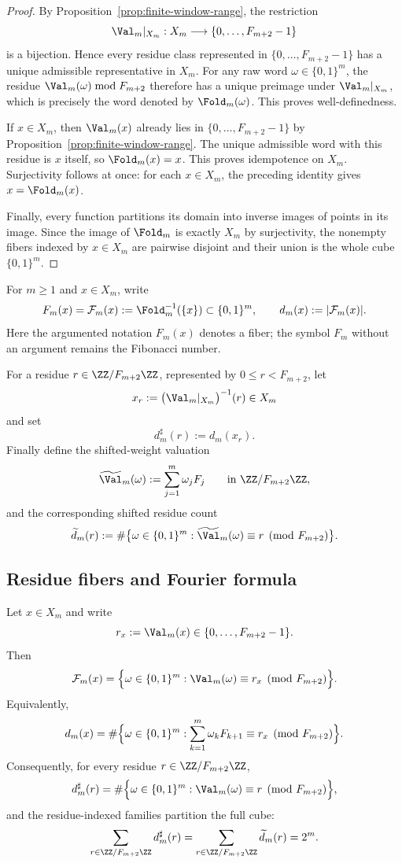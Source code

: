 \begin{proof}
By Proposition~\ref{prop:finite-window-range}, the restriction
\[
\Val_m|_{X_m}:X_m\longrightarrow \{0,\ldots,F_{m+2}-1\}
\]
is a bijection.  Hence every residue class represented in
$\{0,\ldots,F_{m+2}-1\}$ has a unique admissible representative in $X_m$.
For any raw word $\omega\in\{0,1\}^m$, the residue
$\Val_m(\omega)\bmod F_{m+2}$ therefore has a unique preimage under
$\Val_m|_{X_m}$, which is precisely the word denoted by $\Fold_m(\omega)$.
This proves well-definedness.

If $x\in X_m$, then $\Val_m(x)$ already lies in
$\{0,\ldots,F_{m+2}-1\}$ by Proposition~\ref{prop:finite-window-range}.
The unique admissible word with this residue is $x$ itself, so
$\Fold_m(x)=x$.  This proves idempotence on $X_m$.  Surjectivity follows at
once: for each $x\in X_m$, the preceding identity gives $x=\Fold_m(x)$.

Finally, every function partitions its domain into inverse images of points in
its image.  Since the image of $\Fold_m$ is exactly $X_m$ by surjectivity, the
nonempty fibers indexed by $x\in X_m$ are pairwise disjoint and their union is
the whole cube $\{0,1\}^m$.
\end{proof}

\begin{definition}\label{def:fiber-notation-and-residue-counts}
For $m\ge1$ and $x\in X_m$, write
\[
F_m(x)=\mathcal F_m(x):=\Fold_m^{-1}(\{x\})\subset\{0,1\}^m,
\qquad
d_m(x):=|\mathcal F_m(x)|.
\]
Here the argumented notation $F_m(x)$ denotes a fiber; the symbol $F_m$
without an argument remains the Fibonacci number.

For a residue $r\in\ZZ/F_{m+2}\ZZ$, represented by
$0\le r<F_{m+2}$, let
\[
x_r:=\bigl(\Val_m|_{X_m}\bigr)^{-1}(r)\in X_m
\]
and set
\[
d_m^\sharp(r):=d_m(x_r).
\]
Finally define the shifted-weight valuation
\[
\widetilde{\Val}_m(\omega):=\sum_{j=1}^m \omega_j F_j
\qquad\text{in }\ZZ/F_{m+2}\ZZ,
\]
and the corresponding shifted residue count
\[
\widetilde d_m(r):=
\#\bigl\{\omega\in\{0,1\}^m:
\widetilde{\Val}_m(\omega)\equiv r\pmod {F_{m+2}}\bigr\}.
\]
\end{definition}

\subsection{Residue fibers and Fourier formula}\label{sec:stab:fiber}

\begin{theorem}\label{thm:fiber-residue}
Let $x\in X_m$ and write
\[
r_x:=\Val_m(x)\in\{0,\ldots,F_{m+2}-1\}.
\]
Then
\[
\mathcal F_m(x)=
\Bigl\{\omega\in\{0,1\}^m:
\Val_m(\omega)\equiv r_x \pmod {F_{m+2}}\Bigr\}.
\]
Equivalently,
\[
d_m(x)=
\#\Bigl\{\omega\in\{0,1\}^m:
\sum_{k=1}^m\omega_kF_{k+1}\equiv r_x\pmod {F_{m+2}}\Bigr\}.
\]
Consequently, for every residue $r\in\ZZ/F_{m+2}\ZZ$,
\[
d_m^\sharp(r)=
\#\Bigl\{\omega\in\{0,1\}^m:
\Val_m(\omega)\equiv r\pmod {F_{m+2}}\Bigr\},
\]
and the residue-indexed families partition the full cube:
\[
\sum_{r\in\ZZ/F_{m+2}\ZZ} d_m^\sharp(r)
=
\sum_{r\in\ZZ/F_{m+2}\ZZ} \widetilde d_m(r)
=2^m.
\]
\end{theorem}

